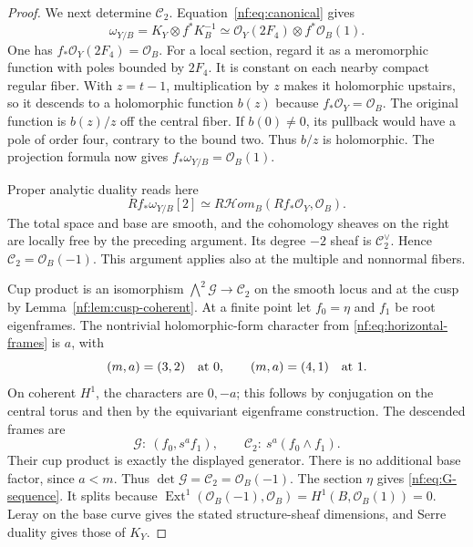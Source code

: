 \begin{proof}
We next determine $\mathcal C_2$. Equation~\eqref{nf:eq:canonical}
gives
\[
 \omega_{Y/B}=K_Y\otimes f^*K_B^{-1}
       \simeq\mathcal O_Y(2F_4)\otimes f^*\mathcal O_B(1).
\]
One has $f_*\mathcal O_Y(2F_4)=\mathcal O_B$.
For a local section, regard it as a meromorphic function
with poles bounded by $2F_4$. It is constant on each nearby
compact regular fiber. With $z=t-1$, multiplication by $z$
makes it holomorphic upstairs, so it descends to a holomorphic
function $b(z)$ because $f_*\mathcal O_Y=\mathcal O_B$.
The original function is $b(z)/z$ off the central fiber.
If $b(0)\ne0$, its pullback would have a pole of order four,
contrary to the bound two. Thus $b/z$ is holomorphic.
The projection formula now gives
$f_*\omega_{Y/B}=\mathcal O_B(1)$.

Proper analytic duality \cite{RamisRugetVerdier} reads here
\begin{equation}\label{nf:eq:proper-duality}
 Rf_*\omega_{Y/B}[2]
 \simeq R\mathcal Hom_B(Rf_*\mathcal O_Y,\mathcal O_B).
\end{equation}
The total space and base are smooth, and the cohomology
sheaves on the right are locally free by the preceding
argument. Its degree $-2$ sheaf is $\mathcal C_2^\vee$.
Hence $\mathcal C_2=\mathcal O_B(-1)$. This argument applies
also at the multiple and nonnormal fibers.

Cup product is an isomorphism
$\bigwedge^2\mathcal G\to\mathcal C_2$ on the smooth locus
and at the cusp by Lemma~\ref{nf:lem:cusp-coherent}.
At a finite point let $f_0=\eta$ and $f_1$ be root eigenframes.
The nontrivial holomorphic-form character from
\eqref{nf:eq:horizontal-frames} is $a$, with
\[
 (m,a)=(3,2)\quad\hbox{at }0,\qquad
 (m,a)=(4,1)\quad\hbox{at }1.
\]
On coherent $H^1$, the characters are $0,-a$; this follows
by conjugation on the central torus and then by the
equivariant eigenframe construction. The descended frames are
\begin{equation}\label{nf:eq:coherent-frames}
 \mathcal G:\ (f_0,s^af_1),\qquad
 \mathcal C_2:\ s^a(f_0\wedge f_1).
\end{equation}
Their cup product is exactly the displayed generator.
There is no additional base factor, since $a<m$.
Thus $\det\mathcal G=\mathcal C_2=\mathcal O_B(-1)$.
The section $\eta$ gives \eqref{nf:eq:G-sequence}.
It splits because
$\operatorname{Ext}^1(\mathcal O_B(-1),\mathcal O_B)
=H^1(B,\mathcal O_B(1))=0$.
Leray on the base curve gives the stated structure-sheaf
dimensions, and Serre duality gives those of $K_Y$.
\end{proof}


